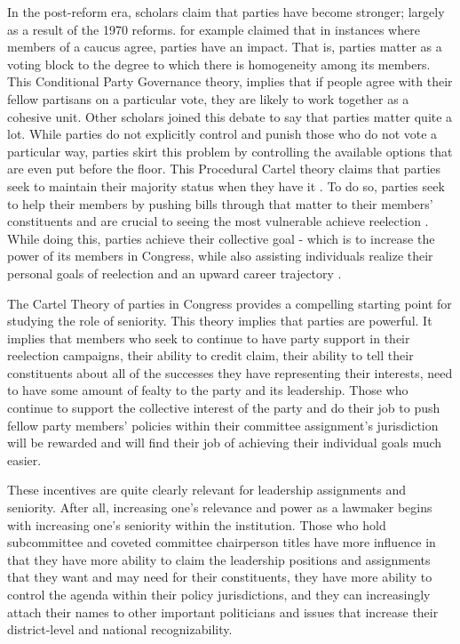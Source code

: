 \documentclass [12pt]{article}
\begin{document}
In the post-reform era, scholars claim that parties have become stronger; largely as a result of the 1970 reforms.  for example claimed that in instances where members of a caucus agree, parties have an impact. That is, parties matter as a voting block to the degree to which there is homogeneity among its members. This Conditional Party Governance theory,  implies that if people agree with their fellow partisans on a particular vote, they are likely to work together as a cohesive unit. Other scholars joined this debate to say that parties matter quite a lot. While parties do not explicitly control and punish those who do not vote a particular way, parties skirt this problem by controlling the available options that are even put before the floor. This Procedural Cartel theory claims that parties seek to maintain their majority status when they have it \cite{Cox2005}. To do so, parties seek to help their members by pushing bills through that matter to their members' constituents and are crucial to seeing the most vulnerable achieve reelection \cite{Cox2005}. While doing this, parties achieve their collective goal - which is to increase the power of its members in Congress, while also assisting individuals realize their personal goals of reelection and an upward career trajectory \cite{Cox2005}. 

The Cartel Theory of parties in Congress provides a compelling starting point for studying the role of seniority. This theory implies that parties are powerful. It implies that members who seek to continue to have party support in their reelection campaigns, their ability to credit claim, their ability to tell their constituents about all of the successes they have representing their interests, need to have some amount of fealty to the party and its leadership. Those who continue to support the collective interest of the party and do their job to push fellow party members' policies within their committee assignment's jurisdiction will be rewarded and will find their job of achieving their individual goals much easier.

These incentives are quite clearly relevant for leadership assignments and seniority. After all, increasing one's relevance and power as a lawmaker begins with increasing one's seniority within the institution. Those who hold subcommittee and coveted committee chairperson titles have more influence in that they have more ability to claim the leadership positions and assignments that they want and may need for their constituents, they have more ability to control the agenda within their policy jurisdictions, and they can increasingly attach their names to other important politicians and issues that increase their district-level and national recognizability. 
\end{document}
